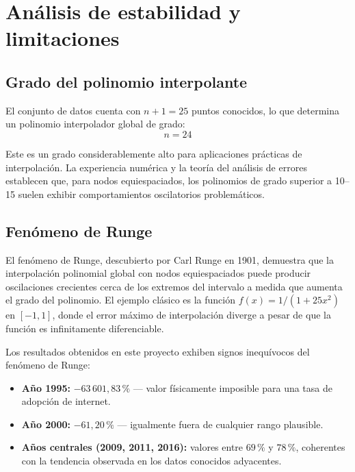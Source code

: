 \documentclass[12pt, letterpaper]{article}
\begin{document}
\section{Análisis de estabilidad y limitaciones}\label{sec:estabilidad}

\subsection{Grado del polinomio interpolante}\label{subsec:grado}

El conjunto de datos cuenta con $n+1 = 25$ puntos conocidos, lo que determina un polinomio interpolador global de grado:
\begin{equation}
\boxed{n = 24}
\end{equation}

Este es un grado considerablemente alto para aplicaciones prácticas de interpolación. La experiencia numérica y la teoría del análisis de errores establecen que, para nodos equiespaciados, los polinomios de grado superior a 10--15 suelen exhibir comportamientos oscilatorios problemáticos.

\subsection{Fenómeno de Runge}\label{subsec:runge}

\begin{tcolorbox}[colback=orange!10!white, colframe=orange!70!black, title=Advertencia: Fenómeno de Runge]
El fenómeno de Runge, descubierto por Carl Runge en 1901, demuestra que la interpolación polinomial global con nodos equiespaciados puede producir oscilaciones crecientes cerca de los extremos del intervalo a medida que aumenta el grado del polinomio. El ejemplo clásico es la función $f(x) = 1/(1+25x^2)$ en $[-1, 1]$, donde el error máximo de interpolación diverge a pesar de que la función es infinitamente diferenciable.
\end{tcolorbox}

Los resultados obtenidos en este proyecto exhiben signos inequívocos del fenómeno de Runge:

\begin{itemize}
    \item \textbf{Año 1995:} $-63\,601{,}83\,\%$ --- valor físicamente imposible para una tasa de adopción de internet.
    \item \textbf{Año 2000:} $-61{,}20\,\%$ --- igualmente fuera de cualquier rango plausible.
    \item \textbf{Años centrales (2009, 2011, 2016):} valores entre $69\,\%$ y $78\,\%$, coherentes con la tendencia observada en los datos conocidos adyacentes.
\end{itemize}
\end{document}
